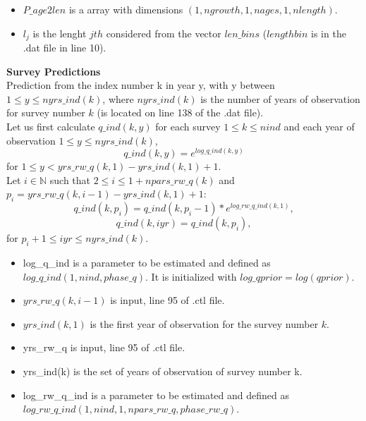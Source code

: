 \documentclass{article}
\begin{document}
\begin{itemize}
    \item $P\_age2len$ is a array with dimensions  $(1,ngrowth,1,nages,1,nlength)$.
\end{itemize}
\begin{itemize}
    \item $l_j$ is the lenght $jth$ considered from the vector $len\_bins$ ($lengthbin$ is in the .dat file in
    line 10).
\end{itemize}

\textbf{Survey Predictions}\\

Prediction from the index number k in year y, with y between $1\leq y \leq nyrs\_ind(k)$, where $nyrs\_ind(k)$ is the number of years of observation for survey number $k$ (is located on line 138 of the .dat file).\\
Let us first calculate $q\_ind(k,y)$ for each survey $1\leq k \leq nind$ and each year of observation $1\leq y \leq nyrs\_ind(k)$,
\begin{equation}
    q\_ind(k,y)=e^{log\_q\_ind(k,y)}
\end{equation}
for $1\leq y < yrs\_rw\_q(k,1)-yrs\_ind(k,1)+1$.\\

Let $i\in\mathbb{N}$ such that $2\leq i \leq 1+npars\_rw\_q(k)$ and $p_i=yrs\_rw\_q(k,i-1)-yrs\_ind(k,1)+1$:
\begin{equation}
     q\_ind(k,p_i)  = q\_ind(k,p_i-1)*e^{log\_rw\_q\_ind(k,1)},
\end{equation}
\begin{equation}
    q\_ind(k,iyr)  = q\_ind(k,p_i), 
\end{equation}
for $p_i+1\leq iyr \leq nyrs\_ind(k).$
\begin{itemize}
    \item log\_q\_ind is a parameter to be estimated and defined as $log\_q\_ind(1,nind,phase\_q)$. It is initialized with $log\_qprior=log(qprior)$.
    \item $yrs\_rw\_q(k,i-1)$ is input, line 95 of .ctl file.
    \item $yrs\_ind(k,1)$ is the first year of observation for the survey number $k$.
    \item yrs\_rw\_q is input, line 95 of .ctl file.
    \item yrs\_ind(k) is the set of years of observation of survey number k. 
    \item log\_rw\_q\_ind is a parameter to be estimated and defined as $log\_rw\_q\_ind(1,nind,1,npars\_rw\_q,phase\_rw\_q) $.
\end{itemize}
\end{document}

